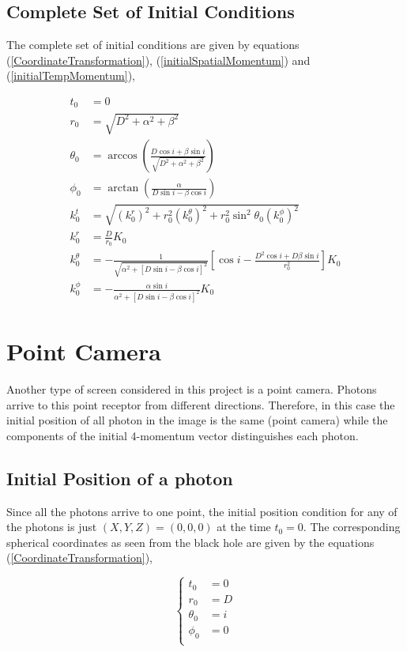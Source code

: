 \subsection{Complete Set of Initial Conditions}

The complete set of initial conditions are given by equations (\ref{CoordinateTransformation}), (\ref{initialSpatialMomentum}) and (\ref{initialTempMomentum}),

\begin{align}
t_0 &= 0\\
r_0 &= \sqrt{D^2 + \alpha^2 + \beta^2} \\
\theta_0 &= \arccos \left( \frac{D \cos i + \beta \sin i}{\sqrt{D^2 + \alpha^2 + \beta^2}}\right)\\
\phi_0 &= \arctan \left( \frac{\alpha}{D\sin i - \beta \cos i} \right) \\
k^t_0 &= \sqrt{(k^r_0)^2 + r_0^2 (k^\theta _0)^2 + r_0^2 \sin^2 \theta_0 (k^\phi _0)^2}\\
k^r_0 &= \frac{D}{r_0} K_0\\
k^\theta _0 &= -\frac{1}{\sqrt{\alpha^2 +[D\sin i - \beta \cos i]^2}}  \left[ \cos i - \frac{D^2 \cos i + D\beta \sin i}{r^2_0}\right] K_0 \\
k^\phi _0 &= -\frac{\alpha \sin i}{\alpha^2 +[D \sin i - \beta \cos i]^2 } K_0
\end{align}


\section{Point Camera}

Another type of screen considered in this project is a point camera. Photons arrive to this point receptor  from different directions. Therefore, in this case the initial position of all photon in the image is the same (point camera) while the components of the initial 4-momentum vector distinguishes each photon.

\subsection{Initial Position of a photon}

Since all the photons arrive to one point, the initial position condition for any of the photons is just $(X,Y,Z) = (0,0,0)$ at the time $t_0 = 0$. The corresponding spherical coordinates as seen from the black hole are given by the equations (\ref{CoordinateTransformation}),

\begin{equation}
\begin{cases}
t_0 &= 0\\
r_0 &= D\\
\theta_0 &= i \\
\phi_0 &= 0 \\
\end{cases} 
\end{equation}

